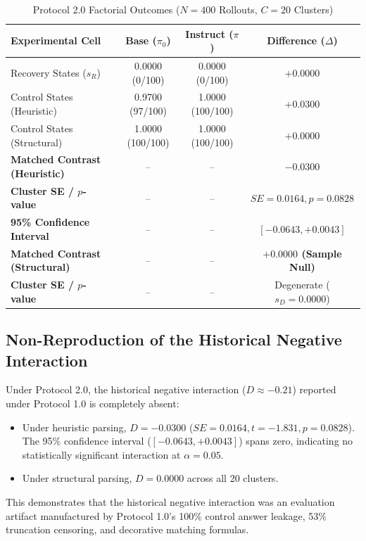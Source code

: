 \documentclass[11pt,letterpaper]{article}
\begin{document}
\begin{table}[htbp]
\centering
\small
\caption{Protocol 2.0 Factorial Outcomes ($N=400$ Rollouts, $C=20$ Clusters)}
\label{tab:outcomes}
\begin{tabular}{lccc}
\toprule
\textbf{Experimental Cell} & \textbf{Base ($\pi_0$)} & \textbf{Instruct ($\pi$)} & \textbf{Difference ($\Delta$)} \\
\midrule
Recovery States ($s_R$) & 0.0000 (0/100) & 0.0000 (0/100) & $+0.0000$ \\
Control States (Heuristic) & 0.9700 (97/100) & 1.0000 (100/100) & $+0.0300$ \\
Control States (Structural) & 1.0000 (100/100) & 1.0000 (100/100) & $+0.0000$ \\
\midrule
\textbf{Matched Contrast (Heuristic)} & -- & -- & \textbf{$-0.0300$} \\
\textbf{Cluster SE / $p$-value} & -- & -- & $SE = 0.0164, p = 0.0828$ \\
\textbf{95\% Confidence Interval} & -- & -- & $[-0.0643, +0.0043]$ \\
\midrule
\textbf{Matched Contrast (Structural)} & -- & -- & \textbf{$+0.0000$ (Sample Null)} \\
\textbf{Cluster SE / $p$-value} & -- & -- & Degenerate ($s_D = 0.0000$) \\
\bottomrule
\end{tabular}
\end{table}

\subsection{Non-Reproduction of the Historical Negative Interaction}
Under Protocol 2.0, the historical negative interaction ($D \approx -0.21$) reported under Protocol 1.0 is completely absent:
\begin{itemize}
    \item Under heuristic parsing, $D = -0.0300$ ($SE = 0.0164, t = -1.831, p = 0.0828$). The 95\% confidence interval ($[-0.0643, +0.0043]$) spans zero, indicating no statistically significant interaction at $\alpha = 0.05$.
    \item Under structural parsing, $D = 0.0000$ across all 20 clusters.
\end{itemize}
This demonstrates that the historical negative interaction was an evaluation artifact manufactured by Protocol 1.0's 100\% control answer leakage, 53\% truncation censoring, and decorative matching formulas.
\end{document}
